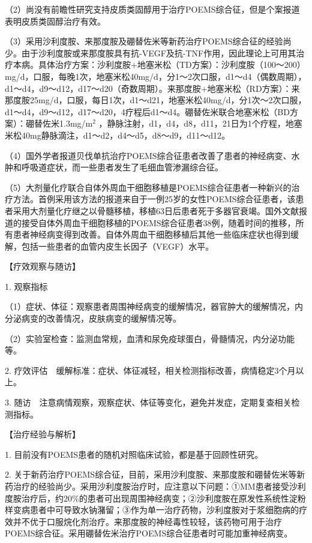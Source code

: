 （2）尚没有前瞻性研究支持皮质类固醇用于治疗POEMS综合征，但是个案报道表明皮质类固醇治疗有效。

（3）采用沙利度胺、来那度胺及硼替佐米等新药治疗POEMS综合征的经验尚少。由于沙利度胺或来那度胺具有抗-VEGF及抗-TNF作用，因此理论上可用其治疗本病。具体治疗方案：沙利度胺+地塞米松（TD方案）：沙利度胺（100～200）mg/d，口服，每晚1次，地塞米松40mg/d，分1～2次口服，d1～d4（偶数周期），d1～d4，d9～d12，d17～d20（奇数周期）。来那度胺+地塞米松（RD方案）：来那度胺25mg/d，口服，每日1次，d1～d21，地塞米松40mg/d，分1次～2次口服，d1～d4，d9～d12，d17～d20，4疗程后d1～d4。硼替佐米联合地塞米松（BD方案）：硼替佐米1.3mg/m$^2$
，静脉注射，d1，d4，d8，d11，21日为1个疗程，地塞米松40mg静脉滴注，d1～d2，d4～d5，d8～d9，d11～d12。

（4）国外学者报道贝伐单抗治疗POEMS综合征患者改善了患者的神经病变、水肿和呼吸道症状，而一些患者发生了毛细血管渗漏综合征。

（5）大剂量化疗联合自体外周血干细胞移植是POEMS综合征患者一种新兴的治疗方法。首例采用该方法的报道来自于一例25岁的女性POEMS综合征患者，该患者采用大剂量化疗继之以骨髓移植，移植63日后患者死于多器官衰竭。国外文献报道的接受自体外周血干细胞移植的POEMS综合征患者38例，随着时间的推移，所有患者神经病变得到改善。自体外周血干细胞移植后其他一些临床症状也得到缓解，包括一些患者的血管内皮生长因子（VEGF）水平。

【疗效观察与随访】

1. 观察指标

（1）症状、体征：观察患者周围神经病变的缓解情况，器官肿大的缓解情况，内分泌病变的改善情况，皮肤病变的缓解情况等。

（2）实验室检查：监测血常规，血清和尿免疫球蛋白，骨髓情况，内分泌功能等。

2.
疗效评估　缓解标准：症状、体征减轻，相关检测指标改善，病情稳定3个月以上。

3.
随访　注意病情观察，观察症状、体征等变化，避免并发症，定期复查相关检测指标。

【治疗经验与解析】

1. 目前没有POEMS患者的随机对照临床试验，都是基于回顾性研究。

2.
关于新药治疗POEMS综合征，目前，采用沙利度胺、来那度胺和硼替佐米等新药治疗的经验尚少。采用沙利度胺治疗时，应注意以下问题：①MM患者接受沙利度胺治疗后，约20\%的患者可出现周围神经病变；②沙利度胺在原发性系统性淀粉样变病患者中可导致水钠潴留；③作为单一治疗药物，沙利度胺对于浆细胞病的疗效并不优于口服烷化剂治疗。来那度胺的神经毒性较轻，该药物可用于治疗POEMS综合征。采用硼替佐米治疗POEMS综合征患者时可能加重神经病变。

